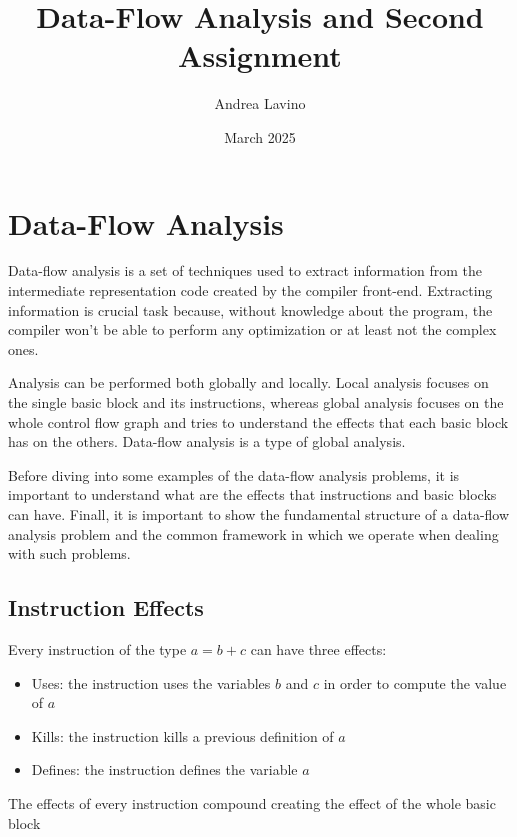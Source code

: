 \documentclass{article}
\title{Data-Flow Analysis and Second Assignment}
\author{Andrea Lavino}
\date{March 2025}
\begin{document}
\maketitle

\clearpage

\tableofcontents

\clearpage

\section{Data-Flow Analysis}

Data-flow analysis is a set of techniques used to extract information from the intermediate representation code created by the compiler front-end. Extracting information is crucial task because, without knowledge about the program, the compiler won't be able to perform any optimization or at least not the complex ones.

Analysis can be performed both globally and locally. Local analysis focuses on the single basic block and its instructions, whereas global analysis focuses on the whole control flow graph and tries to understand the effects that each basic block has on the others. Data-flow analysis is a type of global analysis.

Before diving into some examples of the data-flow analysis problems, it is important to understand what are the effects that instructions and basic blocks can have. Finall, it is important to show the fundamental structure of a data-flow analysis problem and the common framework in which we operate when dealing with such problems.

\subsection{Instruction Effects}

Every instruction of the type $a = b + c$ can have three effects:

\begin{itemize}
    \item Uses: the instruction uses the variables $b$ and $c$ in order to compute the value of $a$
    \item Kills: the instruction kills a previous definition of $a$
    \item Defines: the instruction defines the variable $a$
\end{itemize}

The effects of every instruction compound creating the effect of the whole basic block
\end{document}
